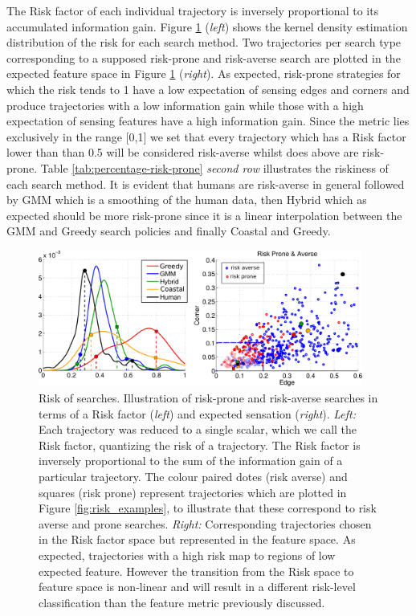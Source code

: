 The Risk factor of each individual trajectory is inversely proportional to its accumulated information gain. Figure \ref{fig:riskexamples} (\textit{left}) shows the kernel density estimation distribution of the risk 
for each search method. Two trajectories per search type corresponding to a supposed risk-prone and risk-averse search
are plotted in the expected feature space in Figure \ref{fig:riskexamples} (\textit{right}). As expected, risk-prone strategies 
for which the risk tends to 1 have a low expectation of sensing edges and corners and produce trajectories with a 
low information gain while those with a high expectation of sensing features have a high information gain. 
Since the metric lies exclusively in the range [0,1] we set that every trajectory which has a Risk factor lower than than 0.5 will 
be considered risk-averse whilst does above are risk-prone. Table \ref{tab:percentage-risk-prone} \textit{second row} illustrates
the riskiness of each search method. It is evident that humans are risk-averse in general followed by GMM which is a smoothing 
of the human data, then Hybrid which as expected should be more risk-prone since it is a linear interpolation between the GMM and 
Greedy search policies and finally Coastal and Greedy.

\begin{figure}[h!]
  \centering
  \includegraphics[width=0.95\textwidth]{./ch3-Search/Figures/Figure7} 
 \caption{Risk of searches. Illustration of risk-prone and risk-averse searches in terms of a Risk factor (\textit{left}) and expected sensation (\textit{right}).
 \textit{Left:} Each trajectory was reduced to a single scalar, which we call the Risk factor, quantizing the risk of a trajectory. The Risk factor 
 is inversely proportional to the sum of the information gain of a particular trajectory. The colour paired dotes (risk averse) and squares (risk prone) 
 represent trajectories which are plotted in 
 Figure \ref{fig:risk_examples}, to illustrate that these correspond to risk averse and prone searches.
 \textit{Right:} Corresponding trajectories chosen in the Risk factor space but represented in the feature space. As expected, trajectories with
 a high risk map to regions of low expected feature. However the transition from the Risk space to feature space is non-linear and will result in a different
 risk-level classification than the feature metric previously discussed.}
 \label{fig:riskexamples}
\end{figure}



